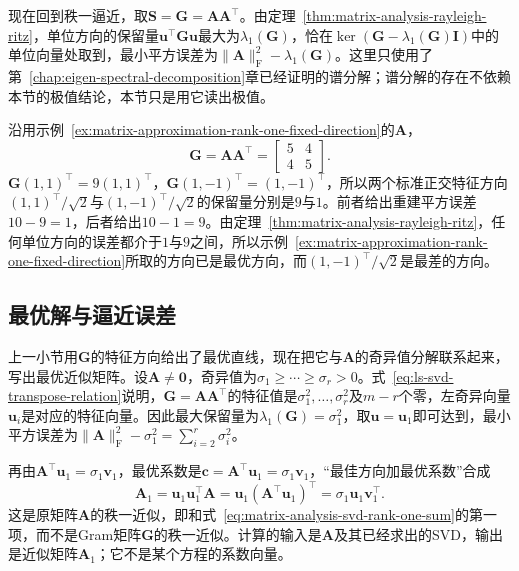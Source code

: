现在回到秩一逼近，取$\bm S=\bm G=\bm A\bm A^\top$。由定理~\ref{thm:matrix-analysis-rayleigh-ritz}，单位方向的保留量$\bm u^\top\bm G\bm u$最大为$\lambda_1(\bm G)$，恰在$\ker(\bm G-\lambda_1(\bm G)\bm I)$中的单位向量处取到，最小平方误差为$\lVert\bm A\rVert_{\mathrm F}^2-\lambda_1(\bm G)$。这里只使用了第~\ref{chap:eigen-spectral-decomposition}章已经证明的谱分解；谱分解的存在不依赖本节的极值结论，本节只是用它读出极值。

\begin{example}[比较两个特征方向]
\label{ex:matrix-approximation-rank-one-eigen-directions}
沿用示例~\ref{ex:matrix-approximation-rank-one-fixed-direction}的$\bm A$，
\[
 \bm G=\bm A\bm A^\top=\begin{bmatrix}5&4\\4&5\end{bmatrix}.
\]
$\bm G(1,1)^\top=9(1,1)^\top$，$\bm G(1,-1)^\top=(1,-1)^\top$，所以两个标准正交特征方向$(1,1)^\top/\sqrt2$与$(1,-1)^\top/\sqrt2$的保留量分别是$9$与$1$。前者给出重建平方误差$10-9=1$，后者给出$10-1=9$。由定理~\ref{thm:matrix-analysis-rayleigh-ritz}，任何单位方向的误差都介于$1$与$9$之间，所以示例~\ref{ex:matrix-approximation-rank-one-fixed-direction}所取的方向已是最优方向，而$(1,-1)^\top/\sqrt2$是最差的方向。
\end{example}

\subsection{最优解与逼近误差}
\label{sec:matrix-approximation-rank-one-solution}

上一小节用$\bm G$的特征方向给出了最优直线，现在把它与$\bm A$的奇异值分解联系起来，写出最优近似矩阵。设$\bm A\neq\bm0$，奇异值为$\sigma_1\geq\cdots\geq\sigma_r>0$。式~\eqref{eq:ls-svd-transpose-relation}说明，$\bm G=\bm A\bm A^\top$的特征值是$\sigma_1^2,\ldots,\sigma_r^2$及$m-r$个零，左奇异向量$\bm u_i$是对应的特征向量。因此最大保留量为$\lambda_1(\bm G)=\sigma_1^2$，取$\bm u=\bm u_1$即可达到，最小平方误差为$\lVert\bm A\rVert_{\mathrm F}^2-\sigma_1^2=\sum_{i=2}^r\sigma_i^2$。

再由$\bm A^\top\bm u_1=\sigma_1\bm v_1$，最优系数是$\bm c=\bm A^\top\bm u_1=\sigma_1\bm v_1$，“最佳方向加最优系数”合成
\[
 \bm A_1=\bm u_1\bm u_1^\top\bm A=\bm u_1(\bm A^\top\bm u_1)^\top=\sigma_1\bm u_1\bm v_1^\top .
\]
这是原矩阵$\bm A$的秩一近似，即和式~\eqref{eq:matrix-analysis-svd-rank-one-sum}的第一项，而不是Gram矩阵$\bm G$的秩一近似。计算的输入是$\bm A$及其已经求出的SVD，输出是近似矩阵$\bm A_1$；它不是某个方程的系数向量。

